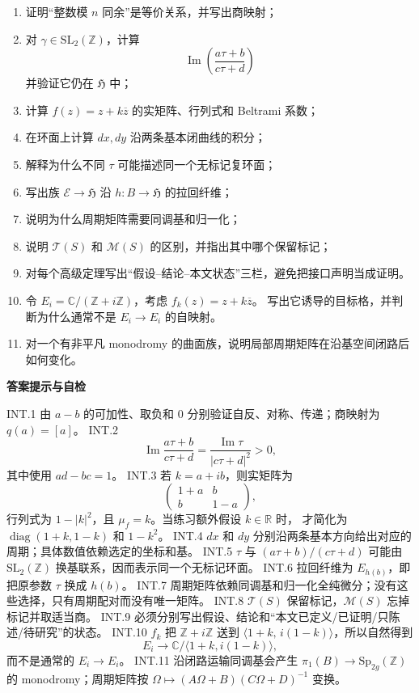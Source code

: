 \documentclass[UTF8,fontset=none,a4paper,11pt]{ctexart}
\theoremstyle{foundation-definition}
\theoremstyle{foundation-theorem}
\theoremstyle{foundation-proposition}
\theoremstyle{foundation-example}
\theoremstyle{foundation-remark}
\theoremstyle{foundation-theorem}
\newcommand{\Z}{\mathbb Z}
\newcommand{\T}{\mathcal T}
\newcommand{\M}{\mathcal M}
\newenvironment{answerkey}{%
\begin{mdframed}[backgroundcolor=examplebg,linecolor=examplepurple,linewidth=1.0pt,
  leftline=true,rightline=false,topline=false,bottomline=false,
  skipabove=7pt,skipbelow=8pt,innerleftmargin=10pt,innerrightmargin=8pt,
  innertopmargin=6pt,innerbottommargin=6pt]
{\sffamily\bfseries\color{examplepurple}答案提示与自检}\par\smallskip\small
}{\end{mdframed}}
\begin{document}
\begin{enumerate}[label=INT.\arabic*.]
  \item 证明“整数模 \(n\) 同余”是等价关系，并写出商映射；
  \item 对 \(\gamma\in\mathrm{SL}_2(\Z)\)，计算
  \[
  \operatorname{Im}\left(\frac{a\tau+b}{c\tau+d}\right)
  \]
  并验证它仍在 \(\mathfrak H\) 中；
  \item 计算 \(f(z)=z+k\overline z\) 的实矩阵、行列式和 Beltrami 系数；
  \item 在环面上计算 \(dx,dy\) 沿两条基本闭曲线的积分；
  \item 解释为什么不同 \(\tau\) 可能描述同一个无标记复环面；
  \item 写出族 \(\mathcal E\to\mathfrak H\) 沿 \(h:B\to\mathfrak H\) 的拉回纤维；
  \item 说明为什么周期矩阵需要同调基和归一化；
  \item 说明 \(\T(S)\) 和 \(\M(S)\) 的区别，并指出其中哪个保留标记；
  \item 对每个高级定理写出“假设--结论--本文状态”三栏，避免把接口声明当成证明。
  \item 令 \(E_i=\mathbb C/(\mathbb Z+i\mathbb Z)\)，考虑 \(f_k(z)=z+k\overline z\)。
    写出它诱导的目标格，并判断为什么通常不是 \(E_i\to E_i\) 的自映射。
  \item 对一个有非平凡 monodromy 的曲面族，说明局部周期矩阵在沿基空间闭路后如何变化。
\end{enumerate}

\begin{answerkey}
INT.1 由 \(a-b\) 的可加性、取负和 \(0\) 分别验证自反、对称、传递；商映射为 \(q(a)=[a]\)。
INT.2
\[
\operatorname{Im}\frac{a\tau+b}{c\tau+d}
=\frac{\operatorname{Im}\tau}{|c\tau+d|^2}>0,
\]
其中使用 \(ad-bc=1\)。
INT.3 若 \(k=a+ib\)，则实矩阵为
\[
\begin{pmatrix}1+a&b\\ b&1-a\end{pmatrix},
\]
行列式为 \(1-|k|^2\)，且 \(\mu_f=k\)。当练习额外假设 \(k\in\mathbb R\) 时，
才简化为 \(\operatorname{diag}(1+k,1-k)\) 和 \(1-k^2\)。
INT.4 \(dx\) 和 \(dy\) 分别沿两条基本方向给出对应的周期；具体数值依赖选定的坐标和基。
INT.5 \(\tau\) 与 \((a\tau+b)/(c\tau+d)\) 可能由 \(\mathrm{SL}_2(\mathbb Z)\) 换基联系，因而表示同一个无标记环面。
INT.6 拉回纤维为 \(E_{h(b)}\)，即把原参数 \(\tau\) 换成 \(h(b)\)。
INT.7 周期矩阵依赖同调基和归一化全纯微分；没有这些选择，只有周期配对而没有唯一矩阵。
INT.8 \(\T(S)\) 保留标记，\(\M(S)\) 忘掉标记并取适当商。
INT.9 必须分别写出假设、结论和“本文已定义/已证明/只陈述/待研究”的状态。
INT.10 \(f_k\) 把 \(\mathbb Z+i\mathbb Z\) 送到
\(\langle 1+k,\,i(1-k)\rangle\)，所以自然得到
\[
E_i\longrightarrow
\mathbb C/\langle1+k,i(1-k)\rangle,
\]
而不是通常的 \(E_i\to E_i\)。
INT.11 沿闭路运输同调基会产生
\(\pi_1(B)\to\mathrm{Sp}_{2g}(\mathbb Z)\) 的 monodromy；周期矩阵按
\(\Omega\mapsto(A\Omega+B)(C\Omega+D)^{-1}\) 变换。
\end{answerkey}
\end{document}
